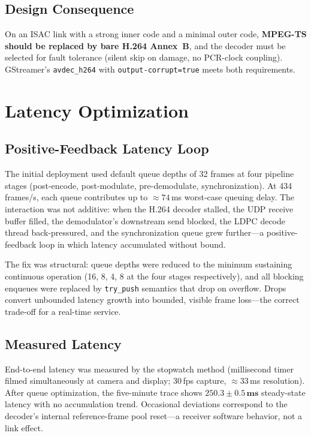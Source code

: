 \documentclass[conference]{IEEEtran}
\begin{document}
\subsection{Design Consequence}

On an ISAC link with a strong inner code and a minimal outer code, \textbf{MPEG-TS should be replaced by bare H.264 Annex~B}, and the decoder must be selected for fault tolerance (silent skip on damage, no PCR-clock coupling). GStreamer's \texttt{avdec\_h264} with \texttt{output-corrupt=true} meets both requirements.

\section{Latency Optimization}
\label{sec:latency}

\subsection{Positive-Feedback Latency Loop}

The initial deployment used default queue depths of 32 frames at four pipeline stages (post-encode, post-modulate, pre-demodulate, synchronization). At 434\,frames/s, each queue contributes up to $\approx\!74$\,ms worst-case queuing delay. The interaction was not additive: when the H.264 decoder stalled, the UDP receive buffer filled, the demodulator's downstream send blocked, the LDPC decode thread back-pressured, and the synchronization queue grew further---a positive-feedback loop in which latency accumulated without bound.

The fix was structural: queue depths were reduced to the minimum sustaining continuous operation (16, 8, 4, 8 at the four stages respectively), and all blocking enqueues were replaced by \texttt{try\_push} semantics that drop on overflow. Drops convert unbounded latency growth into bounded, visible frame loss---the correct trade-off for a real-time service.

\subsection{Measured Latency}

End-to-end latency was measured by the stopwatch method (millisecond timer filmed simultaneously at camera and display; 30\,fps capture, $\approx\!33$\,ms resolution). After queue optimization, the five-minute trace shows $\mathbf{250.3 \pm 0.5\,\text{ms}}$ steady-state latency with no accumulation trend. Occasional deviations correspond to the decoder's internal reference-frame pool reset---a receiver software behavior, not a link effect.
\end{document}
